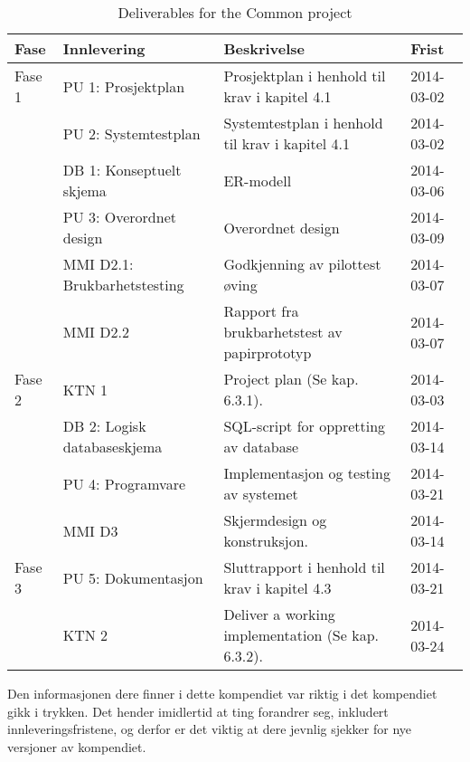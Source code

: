 \begin{table}[h]
\begin{tabularx}{\textwidth}{ l X X l }

\hline
\hline
Fase & Innlevering & Beskrivelse & Frist \\
\hline

Fase 1
&
PU 1: Prosjektplan &
Prosjektplan i henhold til krav i kapitel 4.1 &
2014-03-02 \\

&
PU 2: Systemtestplan &
Systemtestplan i henhold til krav i kapitel 4.1 &
2014-03-02\\

&
DB 1: Konseptuelt skjema &
ER-modell &
2014-03-06 \\

&
PU 3: Overordnet design &
Overordnet design &
2014-03-09 \\

&
MMI D2.1: Brukbarhetstesting &
Godkjenning av pilottest øving &
2014-03-07 \\

&
MMI D2.2 &
Rapport fra brukbarhetstest av papirprototyp &
2014-03-07 \\

Fase 2
&
KTN 1 &
Project plan (Se kap. 6.3.1). &
2014-03-03 \\

&
DB 2: Logisk databaseskjema &
SQL-script for oppretting av database &
2014-03-14 \\

&
PU 4: Programvare &
Implementasjon og testing av systemet &
2014-03-21 \\

&
MMI D3 &
Skjermdesign og konstruksjon. &
2014-03-14 \\

Fase 3
&
PU 5: Dokumentasjon &
Sluttrapport i henhold til krav i kapitel 4.3 &
2014-03-21 \\

&
KTN 2 &
Deliver a working implementation (Se kap. 6.3.2). &
2014-03-24 \\

\hline

\end{tabularx}
\caption{Deliverables for the Common project}
\end{table}

Den informasjonen dere finner i dette kompendiet var riktig i det kompendiet gikk i trykken. Det hender imidlertid at ting forandrer seg, inkludert innleveringsfristene, og derfor er det viktig at dere jevnlig sjekker for nye versjoner av kompendiet.

